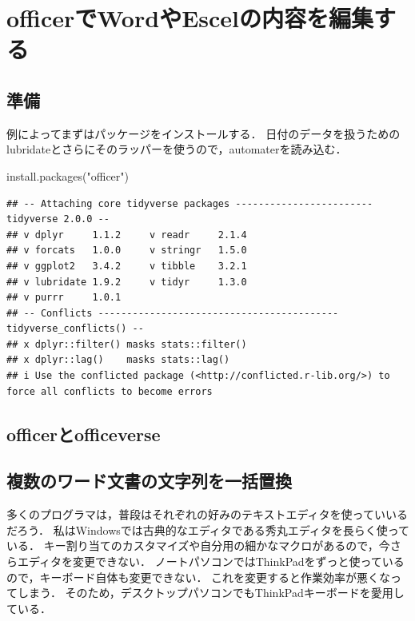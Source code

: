 \documentclass[
]{article}
\newenvironment{Shaded}{\begin{snugshade}}{\end{snugshade}}
\newcommand{\FunctionTok}[1]{\textcolor[rgb]{0.00,0.00,0.00}{#1}}
\newcommand{\NormalTok}[1]{#1}
\newcommand{\StringTok}[1]{\textcolor[rgb]{0.31,0.60,0.02}{#1}}
\begin{document}
\hypertarget{officer}{%
\section{officerでWordやEscelの内容を編集する}\label{officer}}

\hypertarget{ux6e96ux5099-16}{%
\subsection{準備}\label{ux6e96ux5099-16}}

例によってまずはパッケージをインストールする．
日付のデータを扱うためのlubridateとさらにそのラッパーを使うので，automaterを読み込む．

\begin{Shaded}
\begin{Highlighting}[]
\FunctionTok{install.packages}\NormalTok{(}\StringTok{"officer"}\NormalTok{)}
\end{Highlighting}
\end{Shaded}

\begin{verbatim}
## -- Attaching core tidyverse packages ------------------------ tidyverse 2.0.0 --
## v dplyr     1.1.2     v readr     2.1.4
## v forcats   1.0.0     v stringr   1.5.0
## v ggplot2   3.4.2     v tibble    3.2.1
## v lubridate 1.9.2     v tidyr     1.3.0
## v purrr     1.0.1     
## -- Conflicts ------------------------------------------ tidyverse_conflicts() --
## x dplyr::filter() masks stats::filter()
## x dplyr::lag()    masks stats::lag()
## i Use the conflicted package (<http://conflicted.r-lib.org/>) to force all conflicts to become errors
\end{verbatim}

\hypertarget{officerux3068officeverse}{%
\subsection{officerとofficeverse}\label{officerux3068officeverse}}

\hypertarget{ux8907ux6570ux306eux30efux30fcux30c9ux6587ux66f8ux306eux6587ux5b57ux5217ux3092ux4e00ux62ecux7f6eux63db}{%
\subsection{複数のワード文書の文字列を一括置換}\label{ux8907ux6570ux306eux30efux30fcux30c9ux6587ux66f8ux306eux6587ux5b57ux5217ux3092ux4e00ux62ecux7f6eux63db}}

多くのプログラマは，普段はそれぞれの好みのテキストエディタを使っていいるだろう．
私はWindowsでは古典的なエディタである秀丸エディタを長らく使っている．
キー割り当てのカスタマイズや自分用の細かなマクロがあるので，今さらエディタを変更できない．
ノートパソコンではThinkPadをずっと使っているので，キーボード自体も変更できない．
これを変更すると作業効率が悪くなってしまう．
そのため，デスクトップパソコンでもThinkPadキーボードを愛用している．
\end{document}

